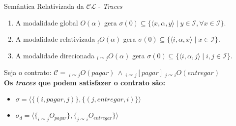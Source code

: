     \begin{frame}{Semântica Relativizada da $\mathcal{CL}$ - \textit{Traces}}
        \begin{enumerate}
            \item A modalidade global $O(\alpha)$ gera $\sigma(0) \subseteq \{\langle x ,\alpha, y\rangle \mid y \in \mathcal{I}, \forall x \in \mathcal{I}\}$.
            \item A modalidade relativizada $_{i}O(\alpha)$ gera $\sigma(0) \subseteq \{\langle i,\alpha, x\rangle \mid x \in \mathcal{I}\}$.
            \item A modalidade direcionada $_{i\curvearrowright j}O(\alpha)$ gera $\sigma(0) \subseteq \{\langle i,\alpha,j\rangle \mid i,j \in \mathcal{I}\}$.
        \end{enumerate}
        Seja o contrato: $\mathcal{C} =\ _{i \curvearrowright j}O(pagar)\ \wedge\ _{i \curvearrowright j}[pagar]\ _{j \curvearrowright i}O(entregar)$
        \\$\quad$\\
        \textbf{Os \textit{traces} que podem satisfazer o contrato são:}
        \begin{itemize}
            \item $\sigma = \langle \{(i,pagar,j)\}, \{(j,entregar,i)\}\rangle$
            \item $\sigma_d = \langle\{_{i\curvearrowright j}O_{pagar} \}, \{_{j\curvearrowright i}O_{entregar} \} \rangle$
        \end{itemize}
    \end{frame}
    
